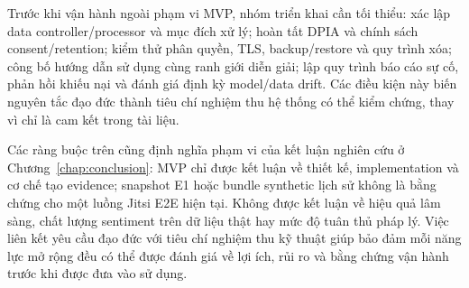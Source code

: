 Trước khi vận hành ngoài phạm vi MVP, nhóm triển khai cần tối thiểu: xác lập data controller/processor và mục đích xử lý; hoàn tất DPIA và chính sách consent/retention; kiểm thử phân quyền, TLS, backup/restore và quy trình xóa; công bố hướng dẫn sử dụng cùng ranh giới diễn giải; lập quy trình báo cáo sự cố, phản hồi khiếu nại và đánh giá định kỳ model/data drift. Các điều kiện này biến nguyên tắc đạo đức thành tiêu chí nghiệm thu hệ thống có thể kiểm chứng, thay vì chỉ là cam kết trong tài liệu.

Các ràng buộc trên cũng định nghĩa phạm vi của kết luận nghiên cứu ở Chương~\ref{chap:conclusion}: MVP chỉ được kết luận về thiết kế, implementation và cơ chế tạo evidence; snapshot E1 hoặc bundle synthetic lịch sử không là bằng chứng cho một luồng Jitsi E2E hiện tại. Không được kết luận về hiệu quả lâm sàng, chất lượng sentiment trên dữ liệu thật hay mức độ tuân thủ pháp lý. Việc liên kết yêu cầu đạo đức với tiêu chí nghiệm thu kỹ thuật giúp bảo đảm mỗi năng lực mở rộng đều có thể được đánh giá về lợi ích, rủi ro và bằng chứng vận hành trước khi được đưa vào sử dụng.
